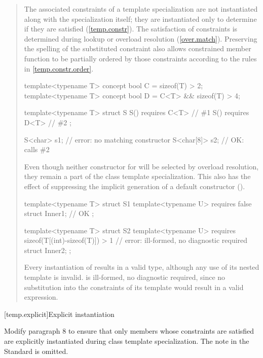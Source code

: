 \begin{quote}
\begin{addedblock}
\setcounter{Paras}{15}
\pnum
The associated constraints of a template specialization are not
instantiated along with the specialization itself; they are
instantiated only to determine if they are satisfied
(\ref{temp.constr}).
% 
\enternote
The satisfaction of constraints is determined during lookup or overload
resolution (\ref{over.match}). Preserving the spelling
of the substituted constraint also allows constrained member function
to be partially ordered by those constraints according to the rules
in \ref{temp.constr.order}.
\exitnote
% 
\enterexample
\begin{codeblock}
template<typename T> concept bool C = sizeof(T) > 2;
template<typename T> concept bool D = C<T> && sizeof(T) > 4;

template<typename T> struct S {
  S() requires C<T> { } // \#1
  S() requires D<T> { } // \#2
};

S<char> s1;    // error: no matching constructor
S<char[8]> s2; // OK: calls \#2
\end{codeblock}

Even though neither constructor for  will be selected by
overload resolution, they remain a part of the class template specialization. 
% 
This also has the effect of suppressing the implicit generation of a default
constructor ().
\exitexample

\enterexample
\begin{codeblock}
template<typename T> struct S1 {
  template<typename U> requires false struct Inner1; // OK
};

template<typename T> struct S2 {
  template<typename U> 
    requires sizeof(T[(int)-sizeof(T)]) > 1 // error: ill-formed, no diagnostic required
      struct Inner2;
};
\end{codeblock}
\exitexample
Every instantiation of  results in a valid type, although any use 
of its nested  template is invalid.
% 
 is ill-formed, no diagnostic required, since no substitution into 
the constraints of its  template would result in a valid 
expression.
\end{addedblock}
\end{quote}


[temp.explicit]{Explicit instantiation}

Modify paragraph 8 to ensure that only members whose constraints are 
satisfied are explicitly instantiated during class template 
specialization. The note in the \Cpp Standard is omitted.

